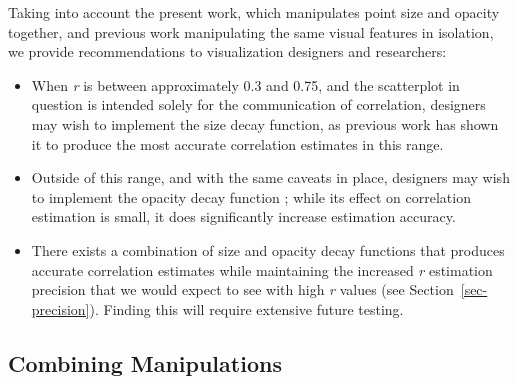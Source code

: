 \documentclass[sigconf]{acmart}
\providecommand{\tightlist}{%
  \setlength{\itemsep}{0pt}\setlength{\parskip}{0pt}}\usepackage{longtable,booktabs,array}
\begin{document}
Taking into account the present work, which manipulates point size and
opacity together, and previous work manipulating the same visual
features in isolation, we provide recommendations to visualization
designers and researchers:

\begin{itemize}
\tightlist
\item
  When \emph{r} is between approximately 0.3 and 0.75, and the
  scatterplot in question is intended solely for the communication of
  correlation, designers may wish to implement the size decay function,
  as previous work \citep{strain_2023b} has shown it to produce the most
  accurate correlation estimates in this range.
\item
  Outside of this range, and with the same caveats in place, designers
  may wish to implement the opacity decay function \citep{strain_2023};
  while its effect on correlation estimation is small, it does
  significantly increase estimation accuracy.
\item
  There exists a combination of size and opacity decay functions that
  produces accurate correlation estimates while maintaining the
  increased \emph{r} estimation precision that we would expect to see
  with high \emph{r} values (see Section~\ref{sec-precision}). Finding
  this will require extensive future testing.
\end{itemize}

\hypertarget{sec-combining}{%
\subsection{Combining Manipulations}\label{sec-combining}}
\end{document}
